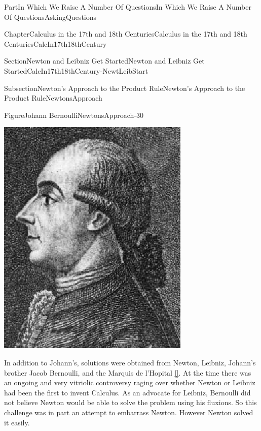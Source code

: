 \documentclass[oneside,10pt,]{book}
\newcommand{\xreffont}{\relax}
\numberwithin{equation}{part}
\begin{document}
\begin{partptx}{Part}{In Which We Raise A Number Of Questions}{}{In Which We Raise A Number Of Questions}{}{}{AskingQuestions}
\begin{chapterptx}{Chapter}{Calculus in the 17th and 18th Centuries}{}{Calculus in the 17th and 18th Centuries}{}{}{CalcIn17th18thCentury}
\begin{sectionptx}{Section}{Newton and Leibniz Get Started}{}{Newton and Leibniz Get Started}{}{}{CalcIn17th18thCentury-NewtLeibStart}
\begin{subsectionptx}{Subsection}{Newton's Approach to the Product Rule}{}{Newton's Approach to the Product Rule}{}{}{NewtonsApproach}
\begin{quote}
\end{quote}
\begin{figureptx}{Figure}{Johann Bernoulli}{NewtonsApproach-30}{}%
%
%
\begin{image}{0.325}{0.35}{0.325}{}%
\includegraphics[width=\linewidth]{external/images/BernoulliJohann.png}
\end{image}%
\tcblower
\end{figureptx}%
 In addition to Johann's, solutions were obtained from Newton, Leibniz, Johann's brother Jacob Bernoulli, and the Marquis de l'Hopital \hyperlink{struik69__sourc_book_mathem}{[{\xreffont 15}]}.  At the time there was an ongoing and very vitriolic controversy raging over whether Newton or Leibniz had been the first to invent Calculus.  As an advocate for Leibniz, Bernoulli did not believe Newton would be able to solve the problem using his fluxions. So this challenge was in part an attempt to embarrass Newton.  However Newton solved it easily.%
\par

\end{subsectionptx}
\end{sectionptx}
\end{chapterptx}
\end{partptx}
\end{document}

